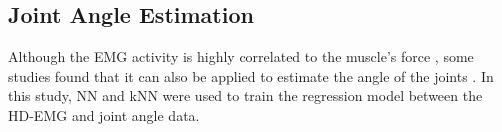 \documentclass[conference]{IEEEtran}
\begin{document}




\subsection{Joint Angle Estimation}
Although the EMG activity is highly correlated to the muscle’s force \cite{b2}\cite{b24}, some studies found that 
it can also be applied to estimate the angle of the joints \cite{b9}\cite{b16}. In this study, NN and kNN were used to train 
the regression model between the HD-EMG and joint angle data.
\end{document}
